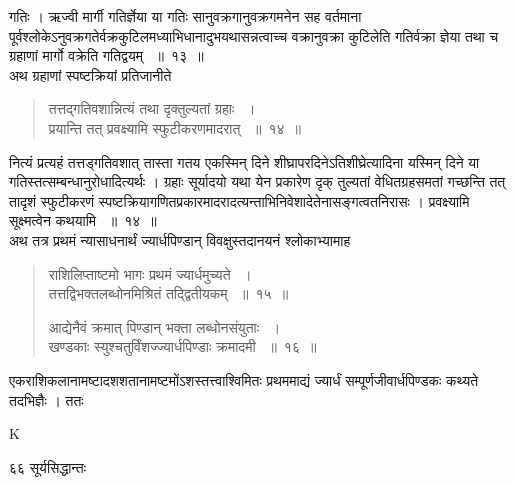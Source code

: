 \documentclass[11pt, openany]{book}
\begin{document}
\begin{sloppypar}
\noindent गतिः । ऋज्वी मार्गी गतिर्ज्ञेया या गतिः सानुवक्रगानुवक्रगमनेन सह वर्तमाना पूर्वश्लोकेऽनुवक्रगतेर्वक्रकुटिलमध्याभिधानादुभयथासन्नत्वाच्च वक्रानुवक्रा कुटिलेति गतिर्वक्रा ज्ञेया तथा च ग्रहाणां मार्गो वक्रेति गतिद्वयम् ~॥~१३~॥\\
\noindent अथ ग्रहाणां स्पष्टक्रियां प्रतिजानीते\textendash
\end{sloppypar}
\begin{quote}

{\ssi तत्तद्गतिवशान्नित्यं तथा दृक्तुल्यतां ग्रहाः ~।\\
प्रयान्ति तत् प्रवक्ष्यामि स्फुटीकरणमादरात् ~॥~१४~॥}
\end{quote}
\begin{sloppypar}

नित्यं प्रत्यहं तत्तड्गतिवशात् तास्ता गतय एकस्मिन् दिने शीघ्रापरदिनेऽतिशीघ्रेत्यादिना यस्मिन् दिने या गतिस्तत्सम्बन्धानुरोधादित्यर्थः । ग्रहाः सूर्यादयो यथा येन प्रकारेण दृक् तुल्यतां वेधितग्रहसमतां गच्छन्ति तत् तादृशं स्फुटीकरणं स्पष्टक्रियागणितप्रकारमादरादत्यन्ताभिनिवेशादेतेनासङ्गत्वतनिरासः । प्रवक्ष्यामि सूक्ष्मत्वेन कथयामि ~॥~१४~॥\\ 
\noindent अथ तत्र प्रथमं न्यासाधनार्थं ज्यार्धपिण्डान् विवक्षुस्तदानयनं श्लोकाभ्यामाह\textendash
\end{sloppypar}
\begin{quote}

{\ssi राशिलिप्ताष्टमो भागः प्रथमं ज्यार्धमुच्यते ~।\\
तत्तद्विभक्तलब्धोनमिश्रितं तद्द्वितीयकम् ~॥~१५~॥

आद्येनैवं क्रमात् पिण्डान् भक्ता लब्धोनसंयुताः ~।\\
खण्डकाः स्युश्चतुर्विंशज्ज्यार्धपिण्डाः क्रमादमी ~॥~१६~॥}
\end{quote}
\begin{sloppypar}
एकराशिकलानामष्टादशशतानामष्टमोंऽशस्तत्त्वाश्विमितः प्रथममाद्यं ज्यार्धं सम्पूर्णजीवार्धपिण्डकः कथ्यते तदभिज्ञैः । ततः
\end{sloppypar}

{\tiny{K}}

\newpage


\noindent ६६ \hspace{4cm} सूर्यसिद्धान्तः
\vspace{1cm}
\end{document}
